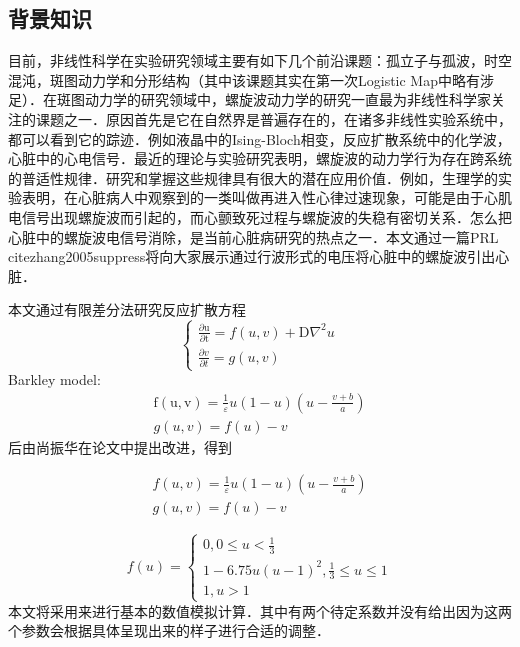 

\subsection{背景知识}
目前，非线性科学在实验研究领域主要有如下几个前沿课题：孤立子与孤波，时空混沌，斑图动力学和分形结构（其中该课题其实在第一次Logistic Map中略有涉足）．在斑图动力学的研究领域中，螺旋波动力学的研究一直最为非线性科学家关注的课题之一．原因首先是它在自然界是普遍存在的，在诸多非线性实验系统中，都可以看到它的踪迹．例如液晶中的Ising-Bloch相变，反应扩散系统中的化学波，心脏中的心电信号．最近的理论与实验研究表明，螺旋波的动力学行为存在跨系统的普适性规律．研究和掌握这些规律具有很大的潜在应用价值．例如，生理学的实验表明，在心脏病人中观察到的一类叫做再进入性心律过速现象，可能是由于心肌电信号出现螺旋波而引起的，而心颤致死过程与螺旋波的失稳有密切关系．怎么把心脏中的螺旋波电信号消除，是当前心脏病研究的热点之一．本文通过一篇PRL cite{zhang2005suppress}将向大家展示通过行波形式的电压将心脏中的螺旋波引出心脏．

本文通过有限差分法研究反应扩散方程
\begin{equation}
\left\{\begin{array}{c}
\frac{\partial \mathrm{u}}{\partial \mathrm{t}}=f(u, v)+\mathrm{D} \nabla^{2} u \\
\frac{\partial v}{\partial t}=g(u, v)
\end{array}\right.
\end{equation}
Barkley model:
\begin{equation}
\begin{array}{c}
\mathrm{f}(\mathrm{u}, \mathrm{v})=\frac{1}{\varepsilon} u(1-u)\left(u-\frac{v+b}{a}\right) \\
g(u, v)=f(u)-v
\end{array}
\end{equation}
后由尚振华在论文中提出改进，得到

\begin{equation}
\begin{array}{c}
	f(u, v)=\frac{1}{\varepsilon} u(1-u)\left(u-\frac{v+b}{a}\right)\\
	g(u, v)=f(u)-v
\end{array}
\end{equation}

\begin{equation}
f(u)=\left\{\begin{array}{c}
0,0 \leq u<\frac{1}{3} \\
1-6.75 u(u-1)^{2}, \frac{1}{3} \leq u \leq 1 \\
1, u>1
\end{array}\right.
\end{equation}
本文将采用来进行基本的数值模拟计算．其中有两个待定系数并没有给出因为这两个参数会根据具体呈现出来的样子进行合适的调整．
